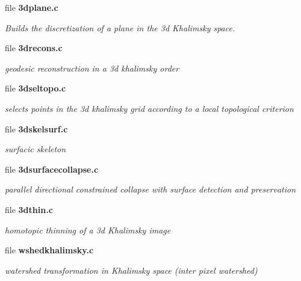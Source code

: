 \begin{CompactItemize}
\item 
file \bf{3dplane.c}
\begin{CompactList}\small\item\em Builds the discretization of a plane in the 3d Khalimsky space. \item\end{CompactList}

\item 
file \bf{3drecons.c}
\begin{CompactList}\small\item\em geodesic reconstruction in a 3d khalimsky order \item\end{CompactList}

\item 
file \bf{3dseltopo.c}
\begin{CompactList}\small\item\em selects points in the 3d khalimsky grid according to a local topological criterion \item\end{CompactList}

\item 
file \bf{3dskelsurf.c}
\begin{CompactList}\small\item\em surfacic skeleton \item\end{CompactList}

\item 
file \bf{3dsurfacecollapse.c}
\begin{CompactList}\small\item\em parallel directional constrained collapse with surface detection and preservation \item\end{CompactList}

\item 
file \bf{3dthin.c}
\begin{CompactList}\small\item\em homotopic thinning of a 3d Khalimsky image \item\end{CompactList}

\item 
file \bf{wshedkhalimsky.c}
\begin{CompactList}\small\item\em watershed transformation in Khalimsky space (inter pixel watershed) \item\end{CompactList}

\end{CompactItemize}

